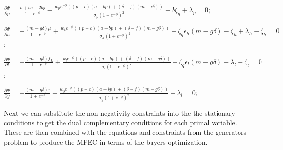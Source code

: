\documentclass[informs]{informs3}
\begin{document}
$\frac{\partial \Psi}{\partial p} = \frac{a+bc-2bp}{1+e^{-\phi}}-\frac{w_p e^{-\phi} \left(\left(p-c\right)(a - bp )  +\left(\delta-f\right)(m -g\delta)\right)}{\sigma_{p}(1+e^{-\phi})^{2}}+b \zeta_q + \lambda_{p}  =0 $;

$\frac{\partial \Psi}{\partial h} = -\frac{\left(m-g\delta\right)\mu}{1+e^{-\phi}}+{\frac{w_h e^{-\phi} \left(\left(p-c\right)(a - bp )  +\left(\delta-f\right)(m -g\delta)\right)}{\sigma_{h}(1+e^{-\phi})^{2}}}+\zeta_q \epsilon_h \left( m-g\delta\right)-\zeta_h+ \lambda_{h}-\zeta_h  =0 $;

$\frac{\partial \Psi}{\partial l} =  -\frac{\left(m-g\delta\right)f_{L}}{1+e^{-\phi}}+{\frac{w_l e^{-\phi} \left(\left(p-c\right)(a - bp )  +\left(\delta-f\right)(m -g\delta)\right)}{\sigma_{l}(1+e^{-\phi})^{2}}}-\zeta_q \epsilon_l \left( m-g\delta\right)+ \lambda_{l}  -\zeta_l=0 $;

$\frac{\partial \Psi}{\partial y} = -\frac{\left(m-g\delta\right)\tau}{1+e^{-\phi}}+ {\frac{w_y e^{-\phi} \left(\left(p-c\right)(a - bp )  +\left(\delta-f\right)(m -g\delta)\right)}{\sigma_{y}(1+e^{-\phi})^{2}}}+\lambda_{l}  =0 $;

Next we can substitute the non-negativity constraints into the the stationary conditions to get the dual complementary conditions for each primal variable. These are then combined with the equations and constraints from the generators problem to produce the MPEC in terms of the buyers optimization.
\end{document}
